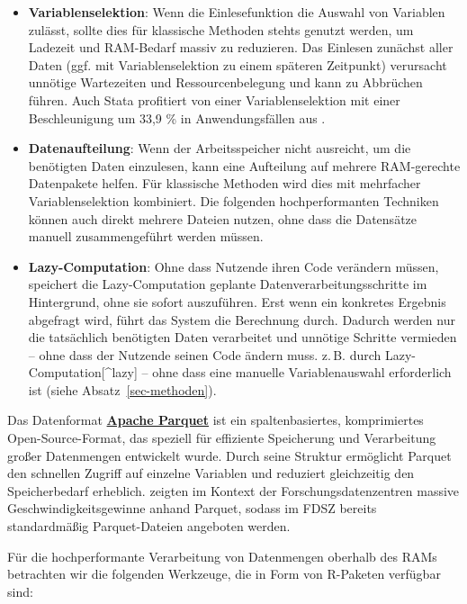 \documentclass[
  german,
  10pt,
  twoside]{article}
\providecommand{\tightlist}{%
  \setlength{\itemsep}{0pt}\setlength{\parskip}{0pt}}
\let\oldtextbf\textbf
\renewcommand{\textbf}[1]{{\color{wistaBlue}\oldtextbf{#1}}}
\let\oldref\ref
\renewcommand{\ref}[1]{\oldref{#1}\raisebox{-0.2ex}{\scriptsize\color{wistaBlue}\ding{247}}}
\begin{document}
\begin{itemize}
\tightlist
\item
  \textbf{Variablenselektion}: Wenn die Einlesefunktion die Auswahl von
  Variablen zulässt, sollte dies für klassische Methoden stehts genutzt
  werden, um Ladezeit und RAM-Bedarf massiv zu reduzieren. Das Einlesen
  zunächst aller Daten (ggf. mit Variablenselektion zu einem späteren
  Zeitpunkt) verursacht unnötige Wartezeiten und Ressourcenbelegung und
  kann zu Abbrüchen führen. Auch Stata profitiert von einer
  Variablenselektion mit einer Beschleunigung um 33,9 \% in
  Anwendungsfällen aus \textcite{gomolka2021largedata}.
\item
  \textbf{Datenaufteilung}: Wenn der Arbeitsspeicher nicht ausreicht, um
  die benötigten Daten einzulesen, kann eine Aufteilung auf mehrere
  RAM-gerechte Datenpakete helfen. Für klassische Methoden wird dies mit
  mehrfacher Variablenselektion kombiniert. Die folgenden
  hochperformanten Techniken können auch direkt mehrere Dateien nutzen,
  ohne dass die Datensätze manuell zusammengeführt werden müssen.
\item
  \textbf{Lazy-Computation}: Ohne dass Nutzende ihren Code verändern
  müssen, speichert die Lazy-Computation geplante
  Datenverarbeitungsschritte im Hintergrund, ohne sie sofort
  auszuführen. Erst wenn ein konkretes Ergebnis abgefragt wird, führt
  das System die Berechnung durch. Dadurch werden nur die tatsächlich
  benötigten Daten verarbeitet und unnötige Schritte vermieden -- ohne
  dass der Nutzende seinen Code ändern muss. z.\,B. durch
  Lazy-Computation{[}\^{}lazy{]} -- ohne dass eine manuelle
  Variablenauswahl erforderlich ist (siehe Absatz~\ref{sec-methoden}).
\end{itemize}

Das Datenformat \textbf{\href{https://parquet.apache.org/}{Apache
Parquet}} ist ein spaltenbasiertes, komprimiertes Open-Source-Format,
das speziell für effiziente Speicherung und Verarbeitung großer
Datenmengen entwickelt wurde. Durch seine Struktur ermöglicht Parquet
den schnellen Zugriff auf einzelne Variablen und reduziert gleichzeitig
den Speicherbedarf erheblich. \textcite{gomolka2021largedata} zeigten im
Kontext der Forschungsdatenzentren massive Geschwindigkeitsgewinne
anhand Parquet, sodass im FDSZ bereits standardmäßig Parquet-Dateien
angeboten werden.

Für die hochperformante Verarbeitung von Datenmengen oberhalb des RAMs
betrachten wir die folgenden Werkzeuge, die in Form von R-Paketen
verfügbar sind:
\end{document}
